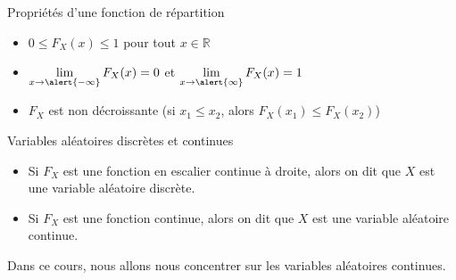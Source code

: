 \documentclass[handout]{BeamerTemplate}
\begin{document}
\begin{frame}[t]{Propriétés d'une fonction de répartition}

{\small
\begin{itemize}
 \item[1.] $0\le F_X(x)\le 1$ pour tout $x\in\mathbb{R}$
 \item[2.] $\lim\limits_{x\to\alert{-\infty}}F_X(x)=0$ et $\lim\limits_{x\to\alert{\infty}}F_X(x)=1$
 \item[3.] $F_X$ est \alert{non décroissante} (si $x_1\le x_2$, alors $F_X(x_1)\le F_X(x_2)$)
\end{itemize}

}
\end{frame}

\begin{frame}[t]{}

\begin{Boite}{Variables aléatoires discrètes et continues}
\begin{itemize}\itemsep3mm
\item  Si $F_X$ est une fonction en escalier continue à droite,  alors on dit que $X$ est une variable aléatoire \alert{discrète}.
\item Si $F_X$ est une fonction continue, alors on dit que  $X$ est une variable aléatoire \alert{continue}.
 \end{itemize}
\end{Boite}

 \vspace{3mm}
 Dans ce cours, nous allons nous concentrer sur les variables
 aléatoires \alert{continues}.
\end{frame}
\end{document}
